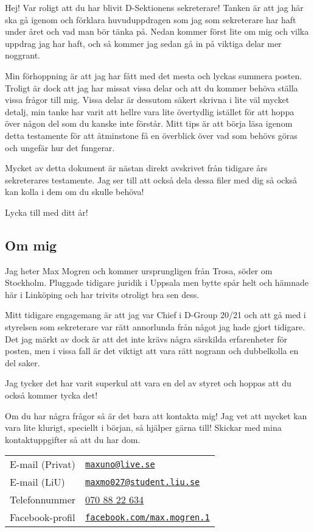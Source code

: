 \documentclass[../testamente_sekreterare_21-22.tex]{subfiles}
\begin{document}
Hej! Var roligt att du har blivit D-Sektionens sekreterare! Tanken är att jag här ska gå igenom och förklara huvuduppdragen som jag som sekreterare har haft under året och vad man bör tänka på. Nedan kommer först lite om mig och vilka uppdrag jag har haft, och så kommer jag sedan gå in på viktiga delar mer noggrant.

Min förhoppning är att jag har fått med det mesta och lyckas summera posten. Troligt är dock att jag har missat vissa delar och att du kommer behöva ställa vissa frågor till mig. Vissa delar är dessutom säkert skrivna i lite väl mycket detalj, min tanke har varit att hellre vara lite övertydlig istället för att hoppa över någon del som du kanske inte förstår. Mitt tips är att börja läsa igenom detta testamente för att åtminstone få en överblick över vad som behövs göras och ungefär hur det fungerar.

Mycket av detta dokument är nästan direkt avskrivet från tidigare års sekreterares testamente. Jag ser till att också dela dessa filer med dig så också kan kolla i dem om du skulle behöva!

Lycka till med ditt år!

\subsection{Om mig}
Jag heter Max Mogren och kommer ursprungligen från Trosa, söder om Stockholm. Pluggade tidigare juridik i Uppsala men bytte spår helt och hämnade här i Linköping och har trivits otroligt bra sen dess.

Mitt tidigare engagemang är att jag var Chief i D-Group 20/21 och att gå med i styrelsen som sekreterare var rätt annorlunda från något jag hade gjort tidigare. Det jag märkt av dock är att det inte krävs några särskilda erfarenheter för posten, men i vissa fall är det viktigt att vara rätt nogrann och dubbelkolla en del saker.

Jag tycker det har varit superkul att vara en del av styret och hoppas att du också kommer tycka det!

Om du har några frågor så är det bara att kontakta mig! Jag vet att mycket kan vara lite klurigt, speciellt i början, så hjälper gärna till! Skickar med mina kontaktuppgifter så att du har dom.

\begin{table}[H]
  \centering
  \begin{tabular}{ll}
    E-mail (Privat) & \href{mailto://maxuno@live.se}{\texttt{maxuno@live.se}}                                  \\[1ex]
    E-mail (LiU)    & \href{mailto://maxmo027@student.liu.se}{\texttt{maxmo027@student.liu.se}}                \\[1ex]
    Telefonnummer   & \href{tel://+46708822634}{070 88 22 634}                                                 \\[1ex]
    Facebook-profil & \href{https://www.facebook.com/max.mogren.1/}{\texttt{facebook.com/max.mogren.1}}        \\[1ex]
  \end{tabular}
\end{table}
\end{document}
